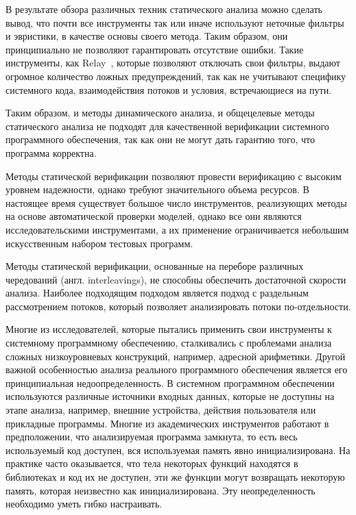 В результате обзора различных техник статического анализа можно сделать вывод, что почти все инструменты так или иначе используют неточные фильтры и эвристики, в качестве основы своего метода.
Таким образом, они принципиально не позволяют гарантировать отсутствие ошибки.
Такие инструменты, как Relay~\cite{Relay}, которые позволяют отключать свои фильтры, выдают огромное количество ложных предупреждений, так как не учитывают специфику системного кода, взаимодействия потоков и условия, встречающиеся на пути.

Таким образом, и методы динамического анализа, и общецелевые методы статического анализа не подходят для качественной верификации системного программного обеспечения, так как они не могут дать гарантию того, что программа корректна.

Методы статической верификации позволяют провести верификацию с высоким уровнем надежности, однако требуют значительного объема ресурсов. 
В настоящее время существует большое число инструментов, реализующих методы на основе автоматической проверки моделей, однако все они являются исследовательскими инструментами, а их применение ограничивается небольшим искусственным набором тестовых программ.

Методы статической верификации, основанные на переборе различных чередований (англ. interleavings), не способны обеспечить достаточной скорости анализа. 
Наиболее подходящим подходом является подход с раздельным рассмотрением потоков, который позволяет анализировать потоки по-отдельности. 

Многие из исследователей, которые пытались применить свои инструменты к системному программному обеспечению, сталкивались с проблемами анализа сложных низкоуровневых конструкций, например, адресной арифметики.
Другой важной особенностью анализа реального программного обеспечения является его принципиальная недоопределенность.
В системном программном обеспечении используются различные источники входных данных, которые не доступны на этапе анализа, например, внешние устройства, действия пользователя или прикладные программы. 
Многие из академических инструментов работают в предположении, что анализируемая программа замкнута, то есть весь используемый код доступен, вся используемая память явно инициализирована.
На практике часто оказывается, что тела некоторых функций находятся в библиотеках и код их не доступен, эти же функции могут возвращать некоторую память, которая неизвестно как инициализирована.
Эту неопределенность необходимо уметь гибко настраивать. 

